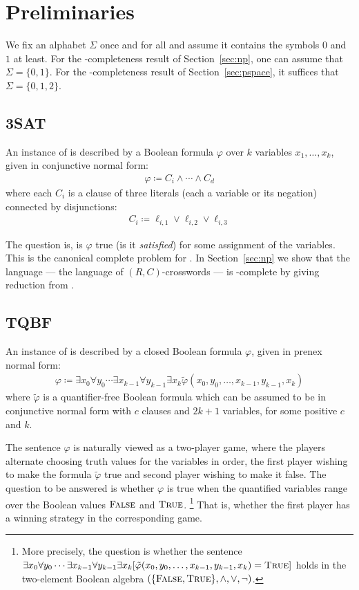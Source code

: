 \documentclass{article}
\newcommand{\0}{\mathbf{0}}
\newcommand{\1}{\mathbf{1}}
\newcommand{\2}{\mathbf{2}}
\newcommand{\TQBF}{\lang{TQBF}}
\newcommand{\myand}{\mathrel{\wedge}}
\newcommand{\myor}{\mathrel{\vee}}
\newcommand{\mynot}{\neg}
\newcommand{\False}{\textsc{False}}
\newcommand{\True}{\textsc{True}}
\renewcommand{\p}{\varphi}
\newcounter{col}
\theoremstyle{plain}
\theoremstyle{definition}
\begin{document}
\section{Preliminaries}\label{sec:prelims}
We fix an alphabet $\Sigma$ once and for all and assume it contains the symbols $0$ and $1$ at least.  For the -completeness result of Section~\ref{sec:np}, one can assume that $\Sigma = \{0,1\}$.  For the -completeness result of Section~\ref{sec:pspace}, it suffices that $\Sigma = \{0,1,2\}$.

\subsection{3SAT}\label{sec:3sat}
An instance of  is described by a Boolean formula $\p$ over $k$ variables $x_1,\ldots,x_k$, given in conjunctive normal form:
\begin{align*}
  \p \coloneqq C_i \land \cdots \land C_d
\end{align*}
where each $C_i$ is a clause of three literals (each a variable or its negation) connected by disjunctions:
\begin{align*}
  C_i \coloneqq \ell_{i,1} \lor \ell_{i,2} \lor \ell_{i,3}
\end{align*}

The question is, is $\p$ true (is it \emph{satisfied}) for some assignment of the variables. This is the canonical complete problem for . In Section~\ref{sec:np} we show that the language  --- the language of $(R,C)$-crosswords --- is -complete by giving reduction from .

\subsection{TQBF}\label{sec:tqbf}

An instance of \TQBF{} is described by a closed Boolean formula $\p$, given in prenex normal form:
\begin{align}\label{eqn:qbf}
  \p \coloneqq \exists x_0 \forall y_0 \cdots \exists x_{k-1} \forall y_{k-1}\exists x_k
  \tilde{\p}(x_0, y_0, \ldots, x_{k-1}, y_{k-1}, x_k)
\end{align}
where $\tilde{\p}$ is a quantifier-free Boolean formula which can be assumed to be in conjunctive normal form with $c$ clauses and $2k+1$ variables, for some positive $c$ and $k$.

The sentence $\p$ is naturally viewed as a two-player game, where the players alternate choosing truth values for the variables in order, the first player wishing to make the formula $\tilde{\p}$ true and second player wishing to make it false.  The question to be answered is whether $\p$ is true when the quantified variables range over the Boolean values $\False$ and $\True$. \footnote{ More precisely, the question is whether the sentence $\exists x_0   \forall y_0 \cdots \exists x_{k-1} \forall y_{k-1}\exists x_k   [\tilde{\p}(x_0, y_0, \ldots, x_{k-1}, y_{k-1}, x_k) = \True]$ holds in the two-element Boolean algebra $(\{\False,\True\},\myand,\myor,\mynot)$. } That is, whether the first player has a winning strategy in the corresponding game.%
\end{document}
